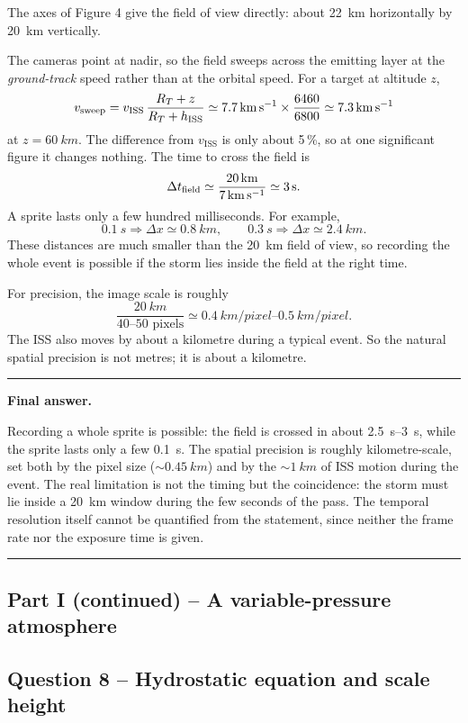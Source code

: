\documentclass[11pt,a4paper]{article}
\newenvironment{finalanswer}{%
  \begin{center}\begin{minipage}{0.94\linewidth}\hrule\vspace{0.45em}\textbf{Final answer. }%
}{%
  \vspace{0.45em}\hrule\end{minipage}\end{center}%
}
\newcommand{\ISS}{\mathrm{ISS}}
\begin{document}
The axes of Figure 4 give the field of view directly: about \SI{22}{km}
horizontally by \SI{20}{km} vertically.

The cameras point at nadir, so the field sweeps across the emitting layer at the
\emph{ground-track} speed rather than at the orbital speed. For a target at
altitude $z$,
\[
 v_{\rm sweep}=v_{\ISS}\,\frac{R_T+z}{R_T+h_{\ISS}}
 \simeq\SI{7.7}{km.s^{-1}}\times\frac{6460}{6800}
 \simeq\SI{7.3}{km.s^{-1}}
\]
at $z=\SI{60}{km}$. The difference from $v_{\ISS}$ is only about 5\,\%, so at one
significant figure it changes nothing. The time to cross the field is
\[
 \Delta t_{\rm field}\simeq \frac{\SI{20}{km}}{\SI{7}{km.s^{-1}}}\simeq\SI{3}{s}.
\]
A sprite lasts only a few hundred milliseconds. For example,
\[
\SI{0.1}{s}\Rightarrow \Delta x\simeq\SI{0.8}{km},
\qquad
\SI{0.3}{s}\Rightarrow \Delta x\simeq\SI{2.4}{km}.
\]
These distances are much smaller than the \SI{20}{km} field of view, so recording the whole event is possible if the storm lies inside the field at the right time.

For precision, the image scale is roughly
\[
 \frac{\SI{20}{km}}{40\text{--}50\text{ pixels}}\simeq \SIrange{0.4}{0.5}{km/pixel}.
\]
The ISS also moves by about a kilometre during a typical event. So the natural spatial precision is not metres; it is about a kilometre.

\begin{finalanswer}
Recording a whole sprite is possible: the field is crossed in about \SIrange{2.5}{3}{s}, while the sprite lasts only a few \SI{0.1}{s}. The spatial precision is roughly kilometre-scale, set both by the pixel size ($\sim\SI{0.45}{km}$) and by the $\sim\SI{1}{km}$ of ISS motion during the event. The real limitation is not the timing but the coincidence: the storm must lie inside a \SI{20}{km} window during the few seconds of the pass. The temporal resolution itself cannot be quantified from the statement, since neither the frame rate nor the exposure time is given.
\end{finalanswer}

\subsection*{Part I (continued) -- A variable-pressure atmosphere}

\subsection*{Question 8 -- Hydrostatic equation and scale height}
\end{document}
